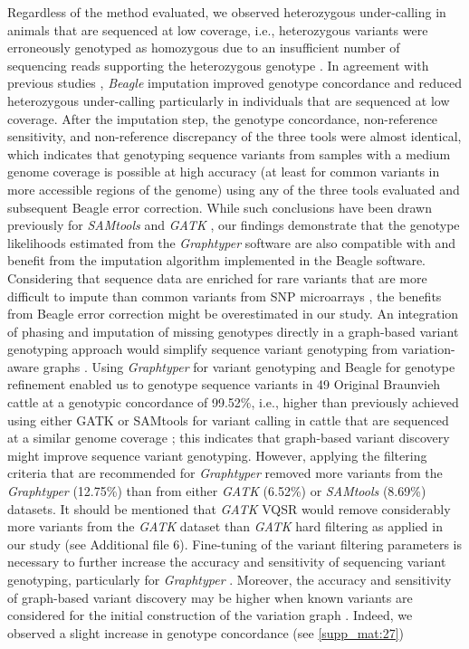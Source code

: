 \documentclass[../main.tex]{subfiles}
\begin{document}
Regardless of the method evaluated, we observed heterozygous under-calling in animals that are sequenced at low coverage, i.e., heterozygous variants were erroneously genotyped as homozygous due to an insufficient number of sequencing reads supporting the heterozygous genotype \citep{nielsen2011genotype,sims2014sequencing,fragoso2016imputing,bilton2018linkage}. In agreement with previous studies \citep{Jansen2013,Daetwyler2014}, \emph{Beagle} imputation improved genotype concordance and reduced heterozygous under-calling particularly in individuals that are sequenced at low coverage. After the imputation step, the genotype concordance, non-reference sensitivity, and non-reference discrepancy of the three tools were almost identical, which indicates that genotyping sequence variants from samples with a medium genome coverage is possible at high accuracy (at least for common variants in more accessible regions of the genome) using any of the three tools evaluated and subsequent Beagle error correction. While such conclusions have been drawn previously for \emph{SAMtools} and \emph{GATK} \citep{Jansen2013,baes2014evaluation}, our findings demonstrate that the genotype likelihoods estimated from the \emph{Graphtyper} software are also compatible with and benefit from the imputation algorithm implemented in the Beagle software. Considering that sequence data are enriched for rare variants that are more difficult to impute than common variants from SNP microarrays \citep{pausch2017evaluation}, the benefits from Beagle error correction might be overestimated in our study. An integration of phasing and imputation of missing genotypes directly in a graph-based variant genotyping approach would simplify sequence variant genotyping from variation-aware graphs \citep{rakocevic2019fast,siren2020haplotype,novak2017graph}. Using \emph{Graphtyper} for variant genotyping and Beagle for genotype refinement enabled us to genotype sequence variants in 49 Original Braunvieh cattle at a genotypic concordance of 99.52\%, i.e., higher than previously achieved using either GATK or SAMtools for variant calling in cattle that are sequenced at a similar genome coverage \citep{Jansen2013,Stothard2015,Boussaha2016,Daetwyler2014,baes2014evaluation,stafuzza2017single}; this indicates that graph-based variant discovery might improve sequence variant genotyping. However, applying the filtering criteria that are recommended for \emph{Graphtyper} \citep{eggertsson2017graphtyper} removed more variants from the \emph{Graphtyper} (12.75\%) than from either \emph{GATK} (6.52\%) or \emph{SAMtools} (8.69\%) datasets. It should be mentioned that \emph{GATK} VQSR would remove considerably more variants from the \emph{GATK} dataset than \emph{GATK} hard filtering as applied in our study (see Additional file 6). Fine-tuning of the variant filtering parameters is necessary to further increase the accuracy and sensitivity of sequencing variant genotyping, particularly for \emph{Graphtyper} \citep{carson2014effective,jun2015efficient}. Moreover, the accuracy and sensitivity of graph-based variant discovery may be higher when known variants are considered for the initial construction of the variation graph \citep{eggertsson2017graphtyper}. Indeed, we observed a slight increase in genotype concordance (see \ref{supp_mat:27}) 
\end{document}
